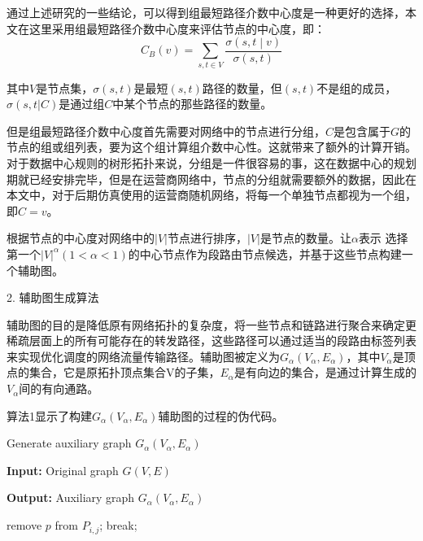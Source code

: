 通过上述研究的一些结论，可以得到组最短路径介数中心度是一种更好的选择，本文在这里采用组最短路径介数中心度来评估节点的中心度，即：
$$C_B\left(v\right)=\sum_{s,t\in V}\frac{\sigma\left(s,t\middle| v\right)}{\sigma(s,t)}$$

其中$V$是节点集，$\sigma\left(s,t\right)$是最短$\left(s,t\right)$路径的数量，但$\left(s,t\right)$不是组的成员，$\sigma(s,t|C)$是通过组$C$中某个节点的那些路径的数量。

但是组最短路径介数中心度首先需要对网络中的节点进行分组，$C$是包含属于$G$的节点的组或组列表，要为这个组计算组介数中心性。这就带来了额外的计算开销。对于数据中心规则的树形拓扑来说，分组是一件很容易的事，这在数据中心的规划期就已经安排完毕，但是在运营商网络中，节点的分组就需要额外的数据，因此在本文中，对于后期仿真使用的运营商随机网络，将每一个单独节点都视为一个组，即$C=v$。

根据节点的中心度对网络中的$|V|$节点进行排序，$|V|$是节点的数量。让$\alpha$表示 选择第一个${|V|}^\alpha(1<\alpha<1)$的中心节点作为段路由节点候选，并基于这些节点构建一个辅助图。

2. 辅助图生成算法

辅助图的目的是降低原有网络拓扑的复杂度，将一些节点和链路进行聚合来确定更稀疏层面上的所有可能存在的转发路径，这些路径可以通过适当的段路由标签列表来实现优化调度的网络流量传输路径。辅助图被定义为$G_\alpha\left(V_\alpha,E_\alpha\right)$，其中$V_\alpha$是顶点的集合，它是原拓扑顶点集合V的子集，$E_\alpha$是有向边的集合，是通过计算生成的$V_\alpha$间的有向通路。

算法1显示了构建$G_\alpha\left(V_\alpha,E_\alpha\right)$辅助图的过程的伪代码。

\begin{algorithm}[h]
\setlength{\abovedisplayskip}{8pt}
\setlength{\belowdisplayskip}{2pt}
\caption{Generate auxiliary graph  $G_\alpha(V_\alpha,E_\alpha)$}  
\hspace*{0.02in} {\bf Input:} 
    Original graph $G(V,E)$
    
\hspace*{0.02in} {\bf Output:}
Auxiliary graph  $G_\alpha(V_\alpha,E_\alpha)$
 
\begin{algorithmic}[1]
\STATE remove $p$ from $P_{i,j}$;
\STATE break;
\ENDIF
\ENDFOR
\ENDFOR
{}
\ELSE
{}
\ENDIF
\ENDFOR
\end{algorithmic}

\end{algorithm}

